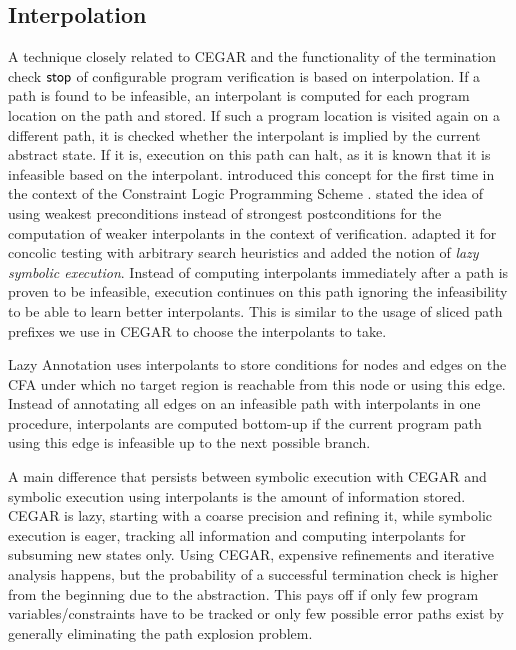 \subsection*{Interpolation}
A technique closely related to CEGAR and the functionality of the termination check $\operatorname{\operatorname{\mathsf{stop}}}$ of configurable program verification is based on interpolation.
If a path is found to be infeasible, an interpolant is computed for each program location on the path and stored.
If such a program location is visited again on a different path, it is checked whether the interpolant is implied by the current abstract state.
If it is, execution on this path can halt, as it is known that it is infeasible based on the interpolant.
\cite{Jaffar2009} introduced this concept for the first time in the context of the Constraint Logic Programming Scheme \cite{Jaffar1992}.
\cite{Jaffar2012} stated the idea of using weakest preconditions instead of strongest postconditions for the computation of weaker interpolants in the context of verification.
\cite{Jaffar2013} adapted it for concolic testing with arbitrary search heuristics and
\cite{Chu2014} added the notion of \emph{lazy symbolic execution}.
Instead of computing interpolants immediately after a path is proven to be infeasible, execution continues on this path ignoring the infeasibility to be able to learn better interpolants.
This is similar to the usage of sliced path prefixes we use in CEGAR to choose the interpolants to take.

Lazy Annotation \cite{McMillan2010} uses interpolants to store conditions for nodes and edges on the CFA under which no target region is reachable from this node or using this edge.
Instead of annotating all edges on an infeasible path with interpolants in one procedure, interpolants are computed bottom-up if the current program path using this edge is infeasible up to the next possible branch.

A main difference that persists between symbolic execution with CEGAR and symbolic execution using interpolants is the amount of information stored.
CEGAR is lazy, starting with a coarse precision and refining it, while symbolic execution is eager,
tracking all information and computing interpolants for subsuming new states only.
Using CEGAR, expensive refinements and iterative analysis happens,
but the probability of a successful termination check is higher from the beginning due to the abstraction.
This pays off if only few program variables/constraints have to be tracked or only few possible error paths exist
by generally eliminating the path explosion problem.


